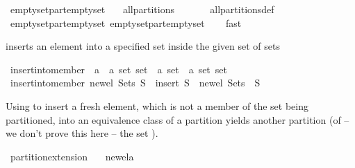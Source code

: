\begin{isabellebody}
\begin{isamarkuptext}
\end{isamarkuptext}%
\isamarkuptrue%
\isamarkupfalse%
\ emptyset{\isacharunderscore}part{\isacharunderscore}emptyset{}{\isacharcolon}\isanewline
\ \ \ {\isachardoublequoteopen}all{\isacharunderscore}partitions\ {\isacharbraceleft}{\isacharbraceright}\ {\isacharequal}\ {\isacharbraceleft}{\isacharbraceleft}{\isacharbraceright}{\isacharbraceright}{\isachardoublequoteclose}\isanewline
%
\isadelimproof
\ \ %
\endisadelimproof
%
\isatagproof
{}\isamarkupfalse%
\ all{\isacharunderscore}partitions{\isacharunderscore}def\isanewline
\ \ \isamarkupfalse%
\ emptyset{\isacharunderscore}part{\isacharunderscore}emptyset{}\ emptyset{\isacharunderscore}part{\isacharunderscore}emptyset{}\isanewline
\ \ \isamarkupfalse%
\ fast%
\endisatagproof
{\isafoldproof}%
%
\isadelimproof
%
\endisadelimproof
%
\begin{isamarkuptext}%
inserts an element into a specified set inside the given set of sets%
\end{isamarkuptext}%
\isamarkuptrue%
\isamarkupfalse%
\ insert{\isacharunderscore}into{\isacharunderscore}member\ {\isacharcolon}{\isacharcolon}\ {\isachardoublequoteopen}{\isacharprime}a\ {\isasymRightarrow}\ {\isacharprime}a\ set\ set\ {\isasymRightarrow}\ {\isacharprime}a\ set\ {\isasymRightarrow}\ {\isacharprime}a\ set\ set{\isachardoublequoteclose}\isanewline
{}\ {\isachardoublequoteopen}insert{\isacharunderscore}into{\isacharunderscore}member\ new{\isacharunderscore}el\ Sets\ S\ {\isacharequal}\ insert\ {\isacharparenleft}S\ {\isasymunion}\ {\isacharbraceleft}new{\isacharunderscore}el{\isacharbraceright}{\isacharparenright}\ {\isacharparenleft}Sets\ {\isacharminus}\ {\isacharbraceleft}S{\isacharbraceright}{\isacharparenright}{\isachardoublequoteclose}%
\begin{isamarkuptext}%
Using  to insert a fresh element, which is not a member of the
  set  being partitioned, into an equivalence class of a partition yields another
  partition (of -- we don't prove this here -- the set ).%
\end{isamarkuptext}%
\isamarkuptrue%
\isamarkupfalse%
\ partition{\isacharunderscore}extension{}{\isacharcolon}\isanewline
\ \ \ new{\isacharunderscore}el{\isacharcolon}{\isacharcolon}{\isacharprime}a\isanewline

\end{isabellebody}
